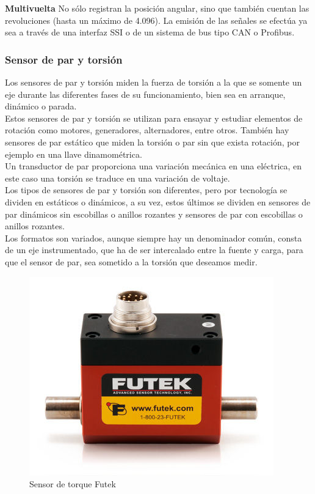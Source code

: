 \documentclass[12pt,titlepage]{article}
\begin{document}
\textbf{Multivuelta}
No sólo registran la posición angular, sino que también cuentan las revoluciones (hasta un máximo de 4.096). La emisión de las señales se efectúa ya sea a través de una interfaz SSI o de un sistema de bus tipo CAN o Profibus. \\[0.8mm] 

\subsubsection{Sensor de par y torsión}
Los sensores de par y torsión miden la fuerza de torsión a la que se somente un eje durante las diferentes fases de su funcionamiento, bien sea en arranque, dinámico o parada. \\[0.8mm] 

Estos sensores de par y torsión se utilizan para ensayar y estudiar elementos de rotación como motores, generadores, alternadores, entre otros. También hay sensores de par estático que miden la torsión o par sin que exista rotación, por ejemplo en una llave dinamométrica.\\[0.8mm] 

Un transductor de par proporciona una variación mecánica en una eléctrica, en este caso una torsión se traduce en una variación de voltaje. \\[0.8mm] 

Los tipos de sensores de par y torsión son diferentes, pero por tecnología se dividen en estáticos o dinámicos, a su vez, estos últimos se dividen en sensores de par dinámicos sin escobillas o anillos rozantes y sensores de par con escobillas o anillos rozantes.\\[0.8mm] 

Los formatos son variados, aunque siempre hay un denominador común, consta de un eje instrumentado,  que ha de ser intercalado entre la fuente y carga, para que el sensor de par, sea sometido a la torsión que deseamos medir. \\[0.8mm] 

\begin{figure}[htbp]
\hspace*{4.5cm} 
\includegraphics[scale=0.80]{sensor_futek}
\caption{Sensor de torque Futek}
\end{figure}
\newpage
\end{document}

